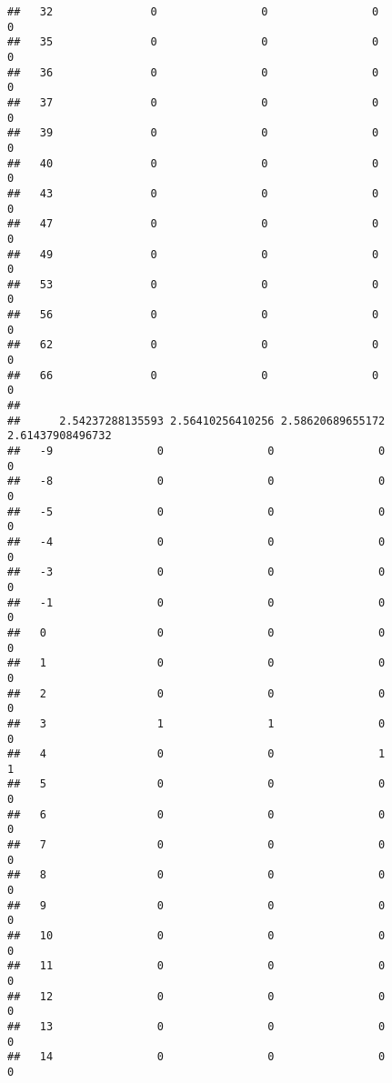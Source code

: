 \documentclass[]{article}
\begin{document}
\begin{verbatim}
##   32               0                0                0                0
##   35               0                0                0                0
##   36               0                0                0                0
##   37               0                0                0                0
##   39               0                0                0                0
##   40               0                0                0                0
##   43               0                0                0                0
##   47               0                0                0                0
##   49               0                0                0                0
##   53               0                0                0                0
##   56               0                0                0                0
##   62               0                0                0                0
##   66               0                0                0                0
##     
##      2.54237288135593 2.56410256410256 2.58620689655172 2.61437908496732
##   -9                0                0                0                0
##   -8                0                0                0                0
##   -5                0                0                0                0
##   -4                0                0                0                0
##   -3                0                0                0                0
##   -1                0                0                0                0
##   0                 0                0                0                0
##   1                 0                0                0                0
##   2                 0                0                0                0
##   3                 1                1                0                0
##   4                 0                0                1                1
##   5                 0                0                0                0
##   6                 0                0                0                0
##   7                 0                0                0                0
##   8                 0                0                0                0
##   9                 0                0                0                0
##   10                0                0                0                0
##   11                0                0                0                0
##   12                0                0                0                0
##   13                0                0                0                0
##   14                0                0                0                0

\end{verbatim}
\end{document}
